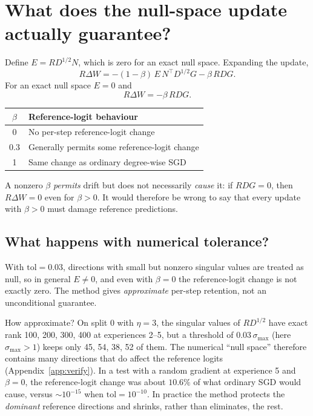 \documentclass[11pt,a4paper]{article}
\begin{document}
\section{What does the null-space update actually guarantee?}\label{sec:guarantee}

Define $E=RD^{1/2}N$, which is zero for an exact null space. Expanding the update,
\[
\boxed{R\Delta W=-(1-\beta)\,E\,N^\top D^{1/2}G-\beta\,RDG.}
\]
For an exact null space $E=0$ and
\[
\boxed{R\Delta W=-\beta\,RDG}.
\]
\begin{center}
\begin{tabular}{@{}cl@{}}
\toprule
$\beta$ & Reference-logit behaviour\\
\midrule
0 & No per-step reference-logit change\\
0.3 & Generally permits some reference-logit change\\
1 & Same change as ordinary degree-wise SGD\\
\bottomrule
\end{tabular}
\end{center}
A nonzero $\beta$ \emph{permits} drift but does not necessarily \emph{cause} it: if $RDG=0$, then $R\Delta W=0$ even for $\beta>0$. It would therefore be wrong to say that every update with $\beta>0$ must damage reference predictions.

\subsection{What happens with numerical tolerance?}

With $\text{tol}=0.03$, directions with small but nonzero singular values are treated as null, so in general $E\neq0$, and even with $\beta=0$ the reference-logit change is not exactly zero. The method gives \emph{approximate} per-step retention, not an unconditional guarantee.

\begin{verifybox}
How approximate? On split 0 with $\eta=3$, the singular values of $RD^{1/2}$ have exact rank 100, 200, 300, 400 at experiences 2--5, but a threshold of $0.03\,\sigma_{\max}$ (here $\sigma_{\max}>1$) keeps only 45, 54, 38, 52 of them. The numerical ``null space'' therefore contains many directions that do affect the reference logits (Appendix~\ref{app:verify}). In a test with a random gradient at experience 5 and $\beta=0$, the reference-logit change was about $10.6\%$ of what ordinary SGD would cause, versus $\sim10^{-15}$ when $\text{tol}=10^{-10}$. In practice the method protects the \emph{dominant} reference directions and shrinks, rather than eliminates, the rest.
\end{verifybox}
\end{document}
